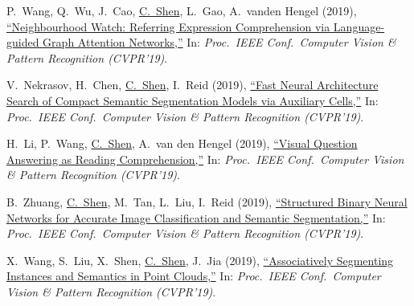 \documentclass[9pt, a4paper]{article}
\newcommand{\years}[1]{\marginnote{\scriptsize #1}}
\def\highlight{\uline}
\begin{document}
\medskip

\years{2019} P.~Wang, Q.~Wu, J.~Cao, \highlight{C.~Shen}, L.~Gao, A.~vanden Hengel (2019),
\href{http://www.google.com/search?lr=&ie=UTF-8&oe=UTF-8&q=Neighbourhood+Watch%3A+Referring+Expression+Comprehension+via+Language-guided+Graph+Attention+Networks+Peng+Wang%2C+Qi+Wu%2C+Jiewei+Cao%2C+Chunhua+Shen%2C+Lianli+Gao%2C+Anton+vanden+Hengel}{``Neighbourhood Watch: Referring Expression Comprehension via Language-guided Graph Attention Networks,{}''}
In: \emph{Proc.\ IEEE Conf.\  Computer Vision \& Pattern Recognition (CVPR'19)}.

\medskip

\years{2019} V.~Nekrasov, H.~Chen, \highlight{C.~Shen}, I.~Reid (2019),
\href{http://www.google.com/search?lr=&ie=UTF-8&oe=UTF-8&q=Fast+Neural+Architecture+Search+of+Compact+Semantic+Segmentation+Models+via+Auxiliary+Cells+Vladimir+Nekrasov%2C+Hao+Chen%2C+Chunhua+Shen%2C+Ian+Reid}{``Fast Neural Architecture Search of Compact Semantic Segmentation Models via Auxiliary Cells,{}''}
In: \emph{Proc.\ IEEE Conf.\  Computer Vision \& Pattern Recognition (CVPR'19)}.

\medskip

\years{2019} H.~Li, P.~Wang, \highlight{C.~Shen}, A.~van den Hengel (2019),
\href{http://www.google.com/search?lr=&ie=UTF-8&oe=UTF-8&q=Visual+Question+Answering+as+Reading+Comprehension+Hui+Li%2C+Peng+Wang%2C+Chunhua+Shen%2C+Anton+van+den+Hengel}{``Visual Question Answering as Reading Comprehension,{}''}
In: \emph{Proc.\ IEEE Conf.\  Computer Vision \& Pattern Recognition (CVPR'19)}.

\medskip

\years{2019} B.~Zhuang, \highlight{C.~Shen}, M.~Tan, L.~Liu, I.~Reid (2019),
\href{http://www.google.com/search?lr=&ie=UTF-8&oe=UTF-8&q=Structured+Binary+Neural+Networks+for+Accurate+Image+Classification+and+Semantic+Segmentation+Bohan+Zhuang%2C+Chunhua+Shen%2C+Mingkui+Tan%2C+Lingqiao+Liu%2C+Ian+Reid}{``Structured Binary Neural Networks for Accurate Image Classification and Semantic Segmentation,{}''}
In: \emph{Proc.\ IEEE Conf.\  Computer Vision \& Pattern Recognition (CVPR'19)}.

\medskip

\years{2019} X.~Wang, S.~Liu, X.~Shen, \highlight{C.~Shen}, J.~Jia (2019),
\href{http://www.google.com/search?lr=&ie=UTF-8&oe=UTF-8&q=Associatively+Segmenting+Instances+and+Semantics+in+Point+Clouds+Xinlong+Wang%2C+Shu+Liu%2C+Xiaoyong+Shen%2C+Chunhua+Shen%2C+Jiaya+Jia}{``Associatively Segmenting Instances and Semantics in Point Clouds,{}''}
In: \emph{Proc.\ IEEE Conf.\  Computer Vision \& Pattern Recognition (CVPR'19)}.
\end{document}
